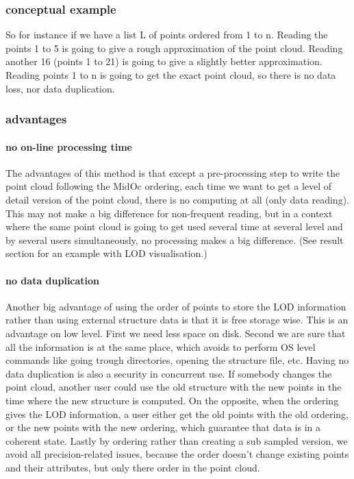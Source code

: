 		\subsubsection{conceptual example}
			So for instance if we have a list L of points ordered from 1 to n.
			Reading the points 1 to 5 is going to give a rough approximation of the point cloud. Reading another 16 (points 1 to 21) is going to give a slightly better approximation. Reading points 1 to n is going to get the exact point cloud, so there is no data loss, nor data duplication.
		
		\subsubsection{advantages}
			\paragraph{no on-line processing time}
				The advantages of this method is that except a pre-processing step to write the point cloud following the MidOc ordering, each time we want to get a level of detail version of the point cloud, there is no computing at all (only data reading).
				This may not make a big difference for non-frequent reading, but in a context where the same point cloud is going to get used several time at several level and by several users simultaneously, no processing makes a big difference.
				(See result section for an example with LOD visualisation.) 		
			\paragraph{no data duplication}
				Another big advantage of using the order of points to store the LOD information rather than using external structure data is that it is free storage wise.
				This is an advantage on low level. First we need less space on disk. Second we are sure that all the information is at the same place, which avoids to perform OS level commands like going trough directories, opening the structure file, etc.
				Having no data duplication is also a security in concurrent use.
				If somebody changes the point cloud, another user could use the old structure with the new points in the time where the new structure is computed.
				On the opposite, when the ordering gives the LOD information, a user either get the old points with the old ordering, or the new points with the new ordering, which guarantee that data is in a coherent state.
				Lastly by ordering rather than creating a sub sampled version, we avoid all precision-related issues, because the order doesn't change existing points and their attributes, but only there order in the point cloud.
